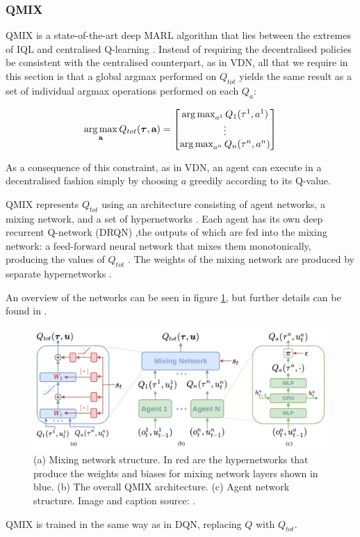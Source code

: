 \subsubsection{QMIX}
QMIX is a state-of-the-art deep MARL algorithm that lies between the extremes of IQL and centralised Q-learning \cite{qmixcite}. Instead of requiring the decentralised policies be consistent with the centralised counterpart, as in VDN, all that we require in this section is that a global argmax performed on $Q_{tot}$ yields
the same result as a set of individual argmax operations
performed on each $Q_a$:

\[\operatorname*{arg\,max}_{\textbf{a}}Q_{tot}(\boldsymbol{\tau},\textbf{a}) = \begin{bmatrix}
        \operatorname*{arg\,max}_{a^1}Q_1(\tau^1,a^1) \\
        \vdots\\
        \operatorname*{arg\,max}_{a^n}Q_n(\tau^n,a^n)
    \end{bmatrix}\]


As a consequence of this constraint, as in VDN, an agent can execute in a decentralised fashion simply by choosing $a$ greedily according to its Q-value.




QMIX represents $Q_{tot}$ using an architecture
consisting of agent networks, a mixing network, and a set
of hypernetworks \cite{hypernetworks} \cite{qmixcite}. Each agent has its own deep recurrent Q-network (DRQN) \cite{dqrn},the outputs of which are fed into the mixing network: a feed-forward neural network that mixes them
monotonically, producing the values of $Q_{tot}$ \cite{qmixcite}. The weights of the mixing network are produced by separate hypernetworks \cite{qmixcite}.

An overview of the networks can be seen in figure \ref{fig:qmix}, but further details can be found in \cite{qmixcite}.

\begin{figure}
    \centering
    \hbox{\hspace{-2.5em}\includegraphics[scale = 0.18]{images/qmix.png}}
    \caption{(a) Mixing network structure. In red are the hypernetworks that produce the weights and biases for mixing network layers shown
in blue. (b) The overall QMIX architecture. (c) Agent network structure. Image and caption source: \cite{qmixcite}.}
    \label{fig:qmix}
\end{figure}





QMIX is trained in the same way as in DQN, replacing $Q$ with $Q_{tot}$.

